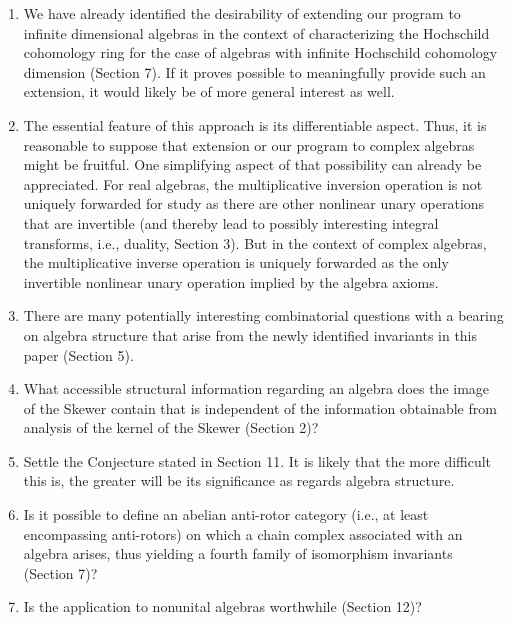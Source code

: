 \documentclass{amsart}
\numberwithin{equation}{section}
\theoremstyle{definition}
\numberwithin{theorem}{section}
\begin{document}
\begin{enumerate}\item We have already identified the desirability of extending our program to infinite dimensional algebras in the context of characterizing the Hochschild cohomology ring for the case of algebras with infinite Hochschild cohomology dimension (Section 7).  If it proves possible to meaningfully provide such an extension, it would likely be of more general interest as well.
\item The essential feature of this approach is its differentiable aspect.  Thus, it is reasonable to suppose that extension or our program to complex algebras might be fruitful.  One simplifying aspect of that possibility can already be appreciated.  For real algebras, the multiplicative inversion operation is not uniquely forwarded for study as there are other nonlinear unary operations that are invertible (and thereby lead to possibly interesting integral transforms, i.e., duality, Section 3).  But in the context of complex algebras, the multiplicative inverse operation is uniquely forwarded as the only invertible nonlinear unary operation implied by the algebra axioms.
\item There are many potentially interesting combinatorial questions with a bearing on algebra structure that arise from the newly identified invariants in this paper (Section 5). 
\item What accessible structural information regarding an algebra does the image of the Skewer contain that is independent of the information obtainable from analysis of the kernel of the Skewer (Section 2)? 
\item Settle the Conjecture stated in Section 11.  It is likely that the more difficult this is, the greater will be its significance as regards algebra structure.
\item Is it possible to define an abelian anti-rotor category  (i.e., at least encompassing anti-rotors) on which a chain complex associated with an algebra arises, thus yielding a fourth family of isomorphism invariants (Section 7)?
\item Is the application to nonunital algebras worthwhile (Section 12)?
\end{enumerate}

\vspace{1cm}
\end{document}
